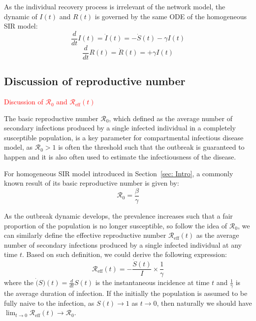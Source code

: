 \documentclass[12pt]{article}
\theoremstyle{plain}
\theoremstyle{definition}
\begin{document}
As the individual recovery process is irrelevant of the network model, the dynamic of $I(t)$ and $R(t)$ is governed by the same ODE of the homogeneous SIR model:
\begin{equation}
	\label{eqn: Ieqn}
	\frac{d}{dt}I(t)=\dot{I}(t)=-\dot{S}(t)-\gamma I(t)
\end{equation}
\begin{equation}
	\label{eqn: Reqn}
	\frac{d}{dt}R(t)=\dot{R}(t)=+\gamma I(t)
\end{equation}


\subsection{Discussion of reproductive number}
\label{sec: Reff}
\textcolor{red}{Discussion of $\mathcal{R}_0$ and $\mathcal{R}_\text{eff}(t)$}

The basic reproductive number $\mathcal{R}_0$, which defined as the average number of secondary infections produced by a single infected individual in a completely susceptible population, is a key parameter for compartmental infectious disease model, as $\mathcal{R}_0>1$ is often the threshold such that the outbreak is guaranteed to happen and it is also often used to estimate the infectiousness of the disease.

For homogeneous SIR model introduced in Section~\ref{sec: Intro}, a commonly known result of its basic reproductive number is given by:
\begin{equation}
	\mathcal{R}_0=\frac{\beta}{\gamma}
\end{equation}

As the outbreak dynamic develops, the prevalence increases such that a fair proportion of the population is no longer susceptible, so follow the idea of $\mathcal{R}_0$, we can similarly define the effective reproductive number $\mathcal{R}_\text{eff}(t)$ as the average number of secondary infections produced by a single infected individual at any time $t$.
Based on such definition, we could derive the following expression:
\begin{equation}
	\mathcal{R}_\text{eff}(t)=-\frac{\dot{S}(t)}{I}\times \frac{1}{\gamma}
\end{equation}
where the $\dot(S)(t)=\frac{d}{dt}S(t)$ is the instantaneous incidence at time $t$ and $\frac{1}{\gamma}$ is the average duration of infection.
If the initially the population is assumed to be fully naive to the infection, as $S(t) \rightarrow 1$ as $t \rightarrow 0$, then naturally we should have $\lim_{t \rightarrow 0}\mathcal{R}_\text{eff}(t) \rightarrow \mathcal{R}_0$.
\end{document}

